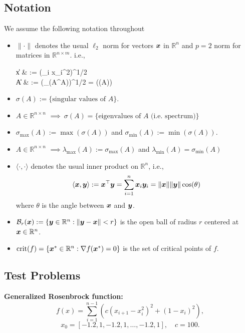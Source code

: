 \documentclass[10pt]{article}
\begin{document}
\subsection*{Notation}
    We assume the following notation throughout\
    \begin{itemize}
        \label{notation}
        \item $\| \cdot \|$ denotes the usual $\ell_2$ norm for vectors $\bm{x}$ in $\mathbb{R}^n$ and $p = 2$ norm
        for matrices in $\mathbb{R}^{n \times m}$. i.e.,
        \begin{flalign*}
            \|x\| & := \left(\sum_i x_i^2\right)^{1/2} \\
                \|A\| & := (\lambda_{\max}(A^\top A))^{1/2}
        = \max(\sigma(A))
        \end{flalign*}
        \item $\sigma(A) := \{\text{singular values of } A\}$.
        \item $A \in \mathbb{R}^{n\times n}$ $\implies ~ \sigma(A) = \{\text{eigenvalues of } A \text{ (i.e. spectrum)}\}$
        \item $\sigma_{\max}(A) := \max(\sigma(A))$ and $\sigma_{\min}(A) := \min(\sigma(A))$.
        \item $ A \in \mathbb{R}^{n\times n}$  $\implies \lambda_{\max}(A) := \sigma_{\max}(A)$ and $\lambda_{\min}(A) = \sigma_{\min}(A) $
        \item $\langle \cdot, \cdot \rangle$ denotes the usual inner product on $\mathbb{R}^n$, i.e.,
        $$
            \langle \bm{x}, \bm{y} \rangle := \bm{x}^\top \bm{y} = \sum_{i=1}^n \bm{x}_i \bm{y}_i = \| \bm{x} \| \|\bm{y}\| \cos(\theta)
        $$
        where $\theta$ is the angle between $\bm{x}$ and $\bm{y}$.
        \item $\mathcal{B}_r(\bm{x}) := \{ \bm{y} \in \mathbb{R}^n : \|\bm{y} - \bm{x}\| < r \}$ is the open ball of 
        radius $r$ centered at $\bm{x} \in \mathbb{R}^n$.
        \item $\text{crit}(f) = \{ \bm{x}^* \in \mathbb{R}^n : \nabla f(\bm{x}^*) = 0 \}$ is the set of critical points of $f$.
    \end{itemize}


\subsection{Test Problems}

\textbf{Generalized Rosenbrock function:}
    \[
    f(x) = \sum_{i=1}^{n-1} \left( c(x_{i+1} - x_i^2)^2 + (1 - x_i)^2 \right),
    \]
    \[
    x_0 = [-1.2, 1, -1.2, 1, \dots, -1.2, 1], \quad c = 100.
    \]
\end{document}

